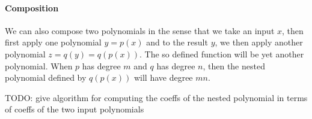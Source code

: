 


\paragraph{Composition}
We can also compose two polynomials in the sense that we take an input $x$, then first apply one polynomial $y = p(x)$ and to the result $y$, we then apply another polynomial $z = q(y) = q(p(x))$. The so defined function will be yet another polynomial. When $p$ has degree $m$ and $q$ has degree $n$, then the nested polynomial defined by $q(p(x))$ will have degree $m n$.

TODO: give algorithm for computing the coeffs of the nested polynomial in terms of coeffs of the two input polynomials






